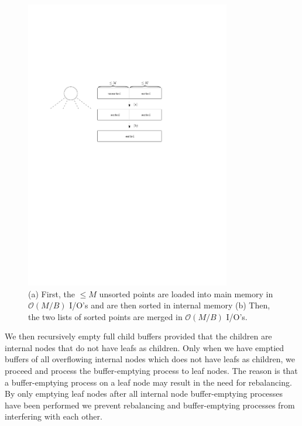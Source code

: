 \documentclass[twoside,11pt,openright]{report}
\begin{document}
\begin{figure}[h]
	\centering
	\includegraphics[width=0.8\textwidth]{../figures/buffer_tree_buffer_sort}
	\caption{(a) First, the $\leq M$ unsorted points are loaded into main memory in $\mathcal{O}(M/B)$ I/O's and are then sorted in internal memory (b) Then, the two lists of sorted points are merged in $\mathcal{O}(M/B)$ I/O's.}
	\label{fig:buffer_tree_buffer_sort}
\end{figure}

We then recursively empty full child buffers provided that the children are internal nodes that do not have leafs as children. Only when we have emptied buffers of all overflowing internal nodes which does not have leafs as children, we proceed and process the buffer-emptying process to leaf nodes. The reason is that a buffer-emptying process on a leaf node may result in the need for rebalancing. By only emptying leaf nodes after all internal node buffer-emptying processes have been performed we prevent rebalancing and buffer-emptying processes from interfering with each other.
\end{document}
